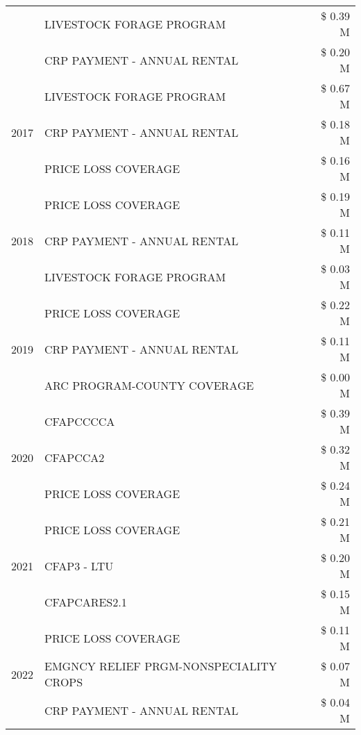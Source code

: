 \begin{tabular}{llr}
 & LIVESTOCK FORAGE PROGRAM & \$ 0.39 M \\
 & CRP PAYMENT - ANNUAL RENTAL & \$ 0.20 M \\
\cline{1-3}
\multirow[t]{3}{*}{2017} & LIVESTOCK FORAGE PROGRAM & \$ 0.67 M \\
 & CRP PAYMENT - ANNUAL RENTAL & \$ 0.18 M \\
 & PRICE LOSS COVERAGE & \$ 0.16 M \\
\cline{1-3}
\multirow[t]{3}{*}{2018} & PRICE LOSS COVERAGE & \$ 0.19 M \\
 & CRP PAYMENT - ANNUAL RENTAL & \$ 0.11 M \\
 & LIVESTOCK FORAGE PROGRAM & \$ 0.03 M \\
\cline{1-3}
\multirow[t]{3}{*}{2019} & PRICE LOSS COVERAGE & \$ 0.22 M \\
 & CRP PAYMENT - ANNUAL RENTAL & \$ 0.11 M \\
 & ARC PROGRAM-COUNTY COVERAGE & \$ 0.00 M \\
\cline{1-3}
\multirow[t]{3}{*}{2020} & CFAPCCCCA & \$ 0.39 M \\
 & CFAPCCA2 & \$ 0.32 M \\
 & PRICE LOSS COVERAGE & \$ 0.24 M \\
\cline{1-3}
\multirow[t]{3}{*}{2021} & PRICE LOSS COVERAGE & \$ 0.21 M \\
 & CFAP3 - LTU & \$ 0.20 M \\
 & CFAPCARES2.1 & \$ 0.15 M \\
\cline{1-3}
\multirow[t]{3}{*}{2022} & PRICE LOSS COVERAGE & \$ 0.11 M \\
 & EMGNCY RELIEF PRGM-NONSPECIALITY CROPS & \$ 0.07 M \\
 & CRP PAYMENT - ANNUAL RENTAL & \$ 0.04 M \\
\cline{1-3}
\bottomrule
\end{tabular}
